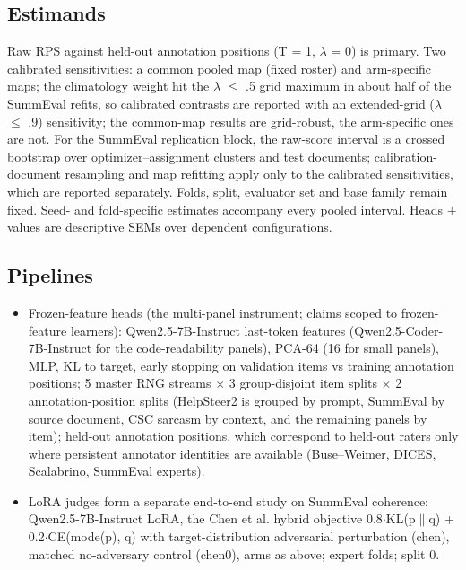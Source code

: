 \documentclass[10pt]{article}
\begin{document}
\subsection{Estimands}

Raw RPS against held-out annotation positions (T = 1, $\lambda$ = 0) is primary. Two calibrated sensitivities: a common pooled map (fixed roster) and arm-specific maps; the climatology weight hit the $\lambda$ $\leq$ .5 grid maximum in about half of the SummEval refits, so calibrated contrasts are reported with an extended-grid ($\lambda$ $\leq$ .9) sensitivity; the common-map results are grid-robust, the arm-specific ones are not. For the SummEval replication block, the raw-score interval is a crossed bootstrap over optimizer--assignment clusters and test documents; calibration-document resampling and map refitting apply only to the calibrated sensitivities, which are reported separately. Folds, split, evaluator set and base family remain fixed. Seed- and fold-specific estimates accompany every pooled interval. Heads $\pm$ values are descriptive SEMs over dependent configurations.

\subsection{Pipelines}

\begin{itemize}
\item
  Frozen-feature heads (the multi-panel instrument; claims scoped to frozen-feature learners): Qwen2.5-7B-Instruct last-token features (Qwen2.5-Coder-7B-Instruct for the code-readability panels), PCA-64 (16 for small panels), MLP, KL to target, early stopping on validation items vs training annotation positions; 5 master RNG streams $\times$ 3 group-disjoint item splits $\times$ 2 annotation-position splits (HelpSteer2 is grouped by prompt, SummEval by source document, CSC sarcasm by context, and the remaining panels by item); held-out annotation positions, which correspond to held-out raters only where persistent annotator identities are available (Buse--Weimer, DICES, Scalabrino, SummEval experts).
\item
  LoRA judges form a separate end-to-end study on SummEval coherence: Qwen2.5-7B-Instruct LoRA, the Chen et al. hybrid objective 0.8$\cdot$KL(p$\|$q) + 0.2$\cdot$CE(mode(p), q) with target-distribution adversarial perturbation (chen), matched no-adversary control (chen0), arms as above; expert folds; split 0.
\end{itemize}
\end{document}
